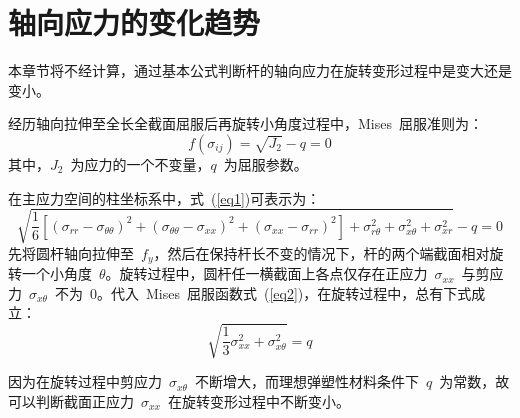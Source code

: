 \chapter{轴向应力的变化趋势}
\setlength{\footskip}{15.61334pt}
\label{cha:trend}
本章节将不经计算，通过基本公式判断杆的轴向应力在旋转变形过程中是变大还是变小。

经历轴向拉伸至全长全截面屈服后再旋转小角度过程中，Mises~屈服准则为：
\begin{equation}\label{eq1}
    f(\sigma_{ij}) = \sqrt{J_2}-q = 0
\end{equation} 
其中，{$J_2$}~为应力的一个不变量，{$q$}~为屈服参数。

在主应力空间的柱坐标系中，式~(\ref{eq1})可表示为：
\begin{equation}\label{eq2}
    \sqrt{\frac{1}{6}[(\sigma_{rr}-\sigma_{\theta \theta})^2+(\sigma_{\theta \theta}-\sigma_{xx})^2+(\sigma_{xx}-\sigma_{rr})^2]+\sigma_{r\theta}^2+\sigma_{x\theta}^2+\sigma_{xr}^2}-q = 0
\end{equation}
先将圆杆轴向拉伸至~{$f_y$}，然后在保持杆长不变的情况下，杆的两个端截面相对旋转一个小角度~{$\theta $}。旋转过程中，圆杆任一横截面上各点仅存在正应力~{$\sigma_{xx}$}~与剪应力~{$\sigma_{x\theta}$}~不为~0。代入~Mises~屈服函数式~(\ref{eq2})，在旋转过程中，总有下式成立：
\begin{equation}\label{eq3}
    \sqrt{\frac{1}{3}\sigma_{xx}^2+\sigma_{x\theta}^2} = q
\end{equation}

因为在旋转过程中剪应力~{$\sigma_{x\theta}$}~不断增大，而理想弹塑性材料条件下~{$q$}~为常数，故可以判断截面正应力~{$\sigma_{xx}$}~在旋转变形过程中不断变小。
